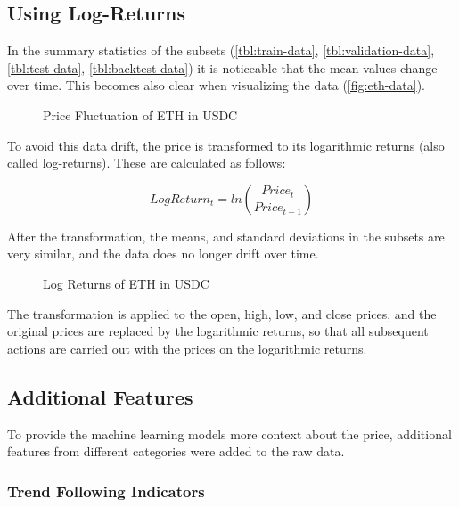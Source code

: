 \subsection{Using Log-Returns}

In the summary statistics of the subsets (\autoref{tbl:train-data}, \autoref{tbl:validation-data}, \autoref{tbl:test-data}, \autoref{tbl:backtest-data}) it is noticeable that the mean values change over time. This becomes also clear when visualizing the data (\autoref{fig:eth-data}).

\begin{figure}[H]
    \centering
    
    \caption{Price Fluctuation of ETH in USDC}
    \label{fig:eth-data}
\end{figure}

To avoid this data drift, the price is transformed to its logarithmic returns (also called log-returns). These are calculated as follows:

\begin{equation}
    LogReturn_t = ln(\frac{Price_t}{Price_{t-1}})
\end{equation}

After the transformation, the means, and standard deviations in the subsets are very similar, and the data does no longer drift over time.

\begin{figure}[H]
    \centering
    
    \caption{Log Returns of ETH in USDC}
    \label{fig:eth-log-data}
\end{figure}

The transformation is applied to the open, high, low, and close prices, and the original prices are replaced by the logarithmic returns, so that all subsequent actions are carried out with the prices on the logarithmic returns.

\subsection{Additional Features}
\label{chap:additional-features}

To provide the machine learning models more context about the price, additional features from different categories were added to the raw data.

\subsubsection{Trend Following Indicators}

